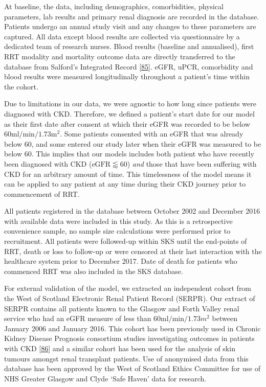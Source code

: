 \documentclass[12pt,PhD,twoside,openright]{muthesis}
\begin{document}
At baseline, the data, including demographics, comorbidities, physical parameters, lab results and primary renal diagnosis are recorded in the database. Patients undergo an annual study visit and any changes to these parameters are captured. All data except blood results are collected via questionnaire by a dedicated team of research nurses. Blood results (baseline and annualised), first RRT modality and mortality outcome data are directly transferred to the database from Salford's Integrated Record {[}\protect\hyperlink{ref-new_obtaining_2014}{85}{]}. eGFR, uPCR, comorbidity and blood results were measured longitudinally throughout a patient's time within the cohort.

Due to limitations in our data, we were agnostic to how long since patients were diagnosed with CKD. Therefore, we defined a patient's start date for our model as their first date after consent at which their eGFR was recorded to be below \(60\textrm{ml}/\textrm{min}/1.73\textrm{m}^2\). Some patients consented with an eGFR that was already below 60, and some entered our study later when their eGFR was measured to be below 60. This implies that our models includes both patient who have recently been diagnosed with CKD (\(\textrm{eGFR} \lessapprox 60\)) \emph{and} those that have been suffering with CKD for an arbitrary amount of time. This timelessness of the model means it can be applied to any patient at any time during their CKD journey prior to commencement of RRT.

All patients registered in the database between October 2002 and December 2016 with available data were included in this study. As this is a retrospective convenience sample, no sample size calculations were performed prior to recruitment. All patients were followed-up within SKS until the end-points of RRT, death or loss to follow-up or were censored at their last interaction with the healthcare system prior to December 2017. Date of death for patients who commenced RRT was also included in the SKS database.

For external validation of the model, we extracted an independent cohort from the West of Scotland Electronic Renal Patient Record (SERPR). Our extract of SERPR contains all patients known to the Glasgow and Forth Valley renal service who had an eGFR measure of less than \(60\textrm{ml}/\textrm{min}/1.73m^2\) between January 2006 and January 2016. This cohort has been previously used in Chronic Kidney Disease Prognosis consortium studies investigating outcomes in patients with CKD {[}\protect\hyperlink{ref-matsushita_cohort_2013}{86}{]} and a similar cohort has been used for the analysis of skin tumours amongst renal transplant patients. Use of anonymised data from this database has been approved by the West of Scotland Ethics Committee for use of NHS Greater Glasgow and Clyde `Safe Haven' data for research.
\end{document}
